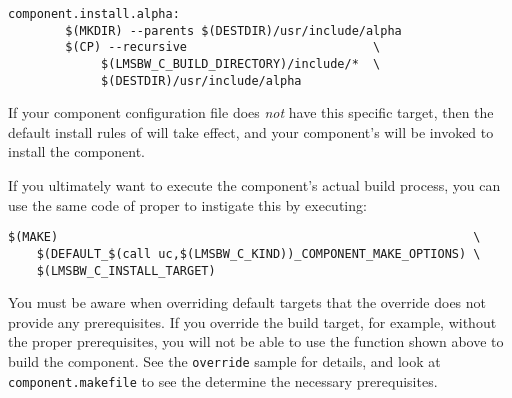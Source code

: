 \begin{verbatim}
component.install.alpha:
        $(MKDIR) --parents $(DESTDIR)/usr/include/alpha
        $(CP) --recursive                          \
             $(LMSBW_C_BUILD_DIRECTORY)/include/*  \
             $(DESTDIR)/usr/include/alpha
\end{verbatim}

If your component configuration file does \emph{not} have this
specific target, then the default install rules of \lmsbw will take
effect, and your component's \makefile will be invoked to install the
component.

If you ultimately want to execute the component's actual build
process, you can use the same code of \lmsbw proper to instigate this
by executing:

\begin{footnotesize}
\begin{verbatim}
$(MAKE)                                                          \
    $(DEFAULT_$(call uc,$(LMSBW_C_KIND))_COMPONENT_MAKE_OPTIONS) \
    $(LMSBW_C_INSTALL_TARGET)
\end{verbatim}
\end{footnotesize}


You must be aware when overriding default targets that the override
does not provide any prerequisites.  If you override the build target,
for example, without the proper prerequisites, you will not be able to
use the function shown above to build the component.  See the
\texttt{override} sample for details, and look at
\texttt{component.makefile} to see the determine the necessary
prerequisites.

